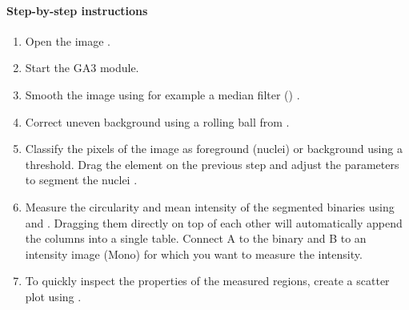 \paragraph{Step-by-step instructions}
\begin{enumerate}
    \item Open the image .
    \item Start the GA3 module.
    \item Smooth the image using for example a median filter () 
    .
    \item Correct uneven background using a rolling ball from  
    .
    \item Classify the pixels of the image as foreground (nuclei) or background using a threshold. Drag the element  on the previous step and adjust the parameters to segment the nuclei 
    .
    \item Measure the circularity and mean intensity of the segmented binaries using  and . Dragging them directly on top of each other will automatically append the columns into a single table. Connect A to the binary and B to an intensity image (Mono) for which you want to measure the intensity.
    \item To quickly inspect the properties of the measured regions, create a scatter plot using .
\end{enumerate}

